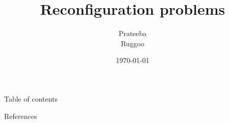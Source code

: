 \documentclass{beamer}
\author{Prateeba\\ Ruggoo}
\title{Reconfiguration problems}
\institute{Université Libre de Bruxelles}
\date{\today}
\begin{document}
\frame{\maketitle}
\begin{frame}{Table of contents}
	\tableofcontents
\end{frame}







\begin{frame}[allowframebreaks]{References}
   \printbibliography    
\end{frame}

\end{document}
